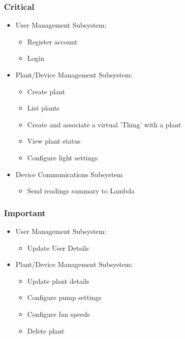 \documentclass{article}
\begin{document}
		\subsubsection{Critical}
			\begin{itemize}
				\item User Management Subsystem:
				\begin{itemize}
					\item Register account
					\item Login
				\end{itemize}
				
				\item Plant/Device Management Subsystem:
				\begin{itemize}
					\item Create plant
					\item List plants
					\item Create and associate a virtual 'Thing' with a plant
					\item View plant status
					\item Configure light settings
				\end{itemize}
				
				\item Device Communications Subsystem
				\begin{itemize}
					\item Send readings summary to Lambda
				\end{itemize}
			\end{itemize}
		
		\subsubsection{Important}
			\begin{itemize}
				\item User Management Subsystem:
				\begin{itemize}
					\item Update User Details
				\end{itemize}
				
				\item Plant/Device Management Subsystem:
				\begin{itemize}
					\item Update plant details
					\item Configure pump settings
					\item Configure fan speeds
					\item Delete plant
				\end{itemize}
			\end{itemize}
			
\end{document}
